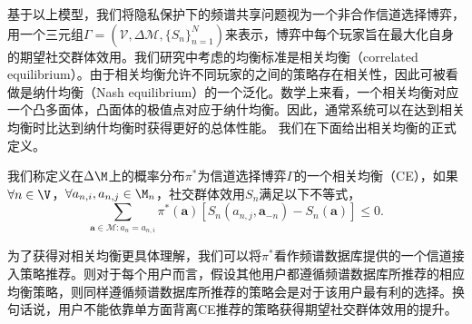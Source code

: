 基于以上模型，我们将隐私保护下的频谱共享问题视为一个非合作信道选择博弈，用一个三元组$\Gamma=\left(\mathcal{V},\Delta\mathcal{M},\{S_n\}_{n=1}^N\right)$来表示，博弈中每个玩家旨在最大化自身的期望社交群体效用。我们研究中考虑的均衡标准是{\kaishu 相关均衡（correlated equilibrium）}。由于相关均衡允许不同玩家的之间的策略存在相关性，因此可被看做是{\kaishu 纳什均衡（Nash equilibrium）}的一个泛化。数学上来看，一个相关均衡对应一个凸多面体，凸面体的极值点对应于纳什均衡。因此，通常系统可以在达到相关均衡时比达到纳什均衡时获得更好的总体性能。
我们在下面给出相关均衡的正式定义。


\begin{df}[相关均衡]
我们称定义在$\Delta\M$上的概率分布$\pi^*$为信道选择博弈$\Gamma$的一个相关均衡（CE），如果$\forall n\in\V$，$\forall a_{n,i},a_{n,j}\in\M_n$，社交群体效用$S_n$满足以下不等式，
\begin{equation}
\sum_{\textbf{a}\in\mathcal{M}:a_n=a_{n,i}}\pi^*(\textbf{a})\left[S_n(a_{n,j},\textbf{a}_{-n})-S_n(\textbf{a})\right]\leq0.
\end{equation}
\end{df}

为了获得对相关均衡更具体理解，我们可以将$\pi^*$看作频谱数据库提供的一个信道接入策略推荐。则对于每个用户而言，假设其他用户都遵循频谱数据库所推荐的相应均衡策略，则同样遵循频谱数据库所推荐的策略会是对于该用户最有利的选择。换句话说，用户不能依靠单方面背离CE推荐的策略获得期望社交群体效用的提升。

